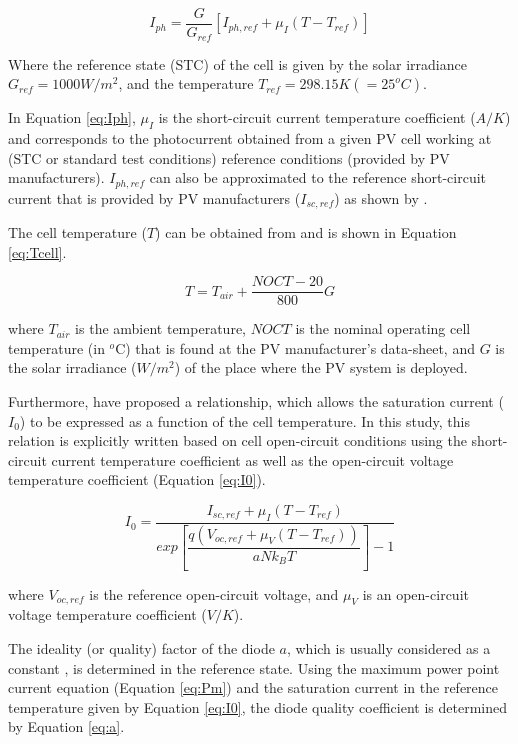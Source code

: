 \begin{equation}
\label{eq:Iph}
I_{ph}=\dfrac{G}{G_{ref}} \left[ I_{ph,ref} + \mu_{I} \left( T-T_{ref} \right)    \right] 
\end{equation}

Where the reference state (STC) of the cell is given by the solar irradiance $ G_{ref}=1000 W/m^{2} $, and the temperature $ T_{ref}=298.15 K (=25^{o}C) $.

In Equation \ref{eq:Iph}, $ \mu_{I} $ is the short-circuit current temperature coefficient ($A/K$) and corresponds to the photocurrent obtained from a given PV cell working at (STC or standard test conditions) reference conditions (provided by PV manufacturers). $ I_{ph,ref} $ can also be approximated to the reference short-circuit current that is provided by PV manufacturers ($ I_{sc,ref} $) as shown by \cite{Jakhrani}.

The cell temperature ($ T $) can be obtained from \cite{Ross} and is shown in Equation \ref{eq:Tcell}.

\begin{equation}
\label{eq:Tcell}
T = T_{air} + \dfrac{NOCT-20}{800}G
\end{equation}

\noindent where $ T_{air} $ is the ambient temperature, $NOCT$ is the nominal operating cell temperature (in $^{o}$C) that is found at the PV manufacturer's data-sheet, and $G$ is the solar irradiance ($ W/m^{2} $) of the place where the PV system is deployed.

Furthermore, \cite{Villalva} have proposed a relationship, which allows the saturation current ($ I_{0} $) to be expressed as a function of the cell temperature. In this study, this relation is explicitly written based on cell open-circuit conditions using the short-circuit current temperature coefficient as well as the open-circuit voltage temperature coefficient (Equation \ref{eq:I0}).

\begin{equation}
\label{eq:I0}
I_{0} = \dfrac{I_{sc,ref} + \mu_{I}(T - T_{ref})}{exp \left[ \dfrac{q(V_{oc,ref} + \mu_{V} (T - T_{ref}))}{aNk_{B}T}    \right] -1}
\end{equation}

\noindent where $ V_{oc,ref} $ is the reference open-circuit voltage, and $ \mu_{V} $ is an open-circuit voltage temperature coefficient ($ V/K $).

The ideality (or quality) factor of the diode $ a $, which is usually considered as a constant \cite{Villalva}, is determined in the reference state. Using the maximum power point current equation (Equation \ref{eq:Pm}) and the saturation current in the reference temperature given by Equation \ref{eq:I0}, the diode quality coefficient is determined by Equation \ref{eq:a}.

